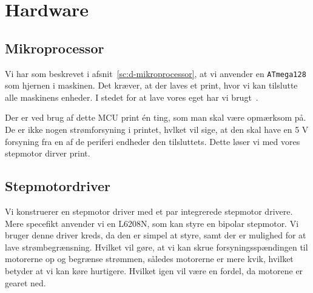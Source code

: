 \chapter[Implementering af hardware]{Hardware}


\section{Mikroprocessor}
\label{sc:i-mcu}
Vi har som beskrevet i afsnit~\vref{sc:d-mikroprocessor}, at vi
anvender en \texttt{ATmega128} som hjernen i maskinen. Det kræver, at
der laves et print, hvor vi kan tilslutte alle maskinens enheder. I
stedet for at lave vores eget har vi brugt~\cite{fronter:atmega128}.

Der er ved brug af dette MCU print én ting, som man skal være
opmærksom på. De er ikke nogen strømforsyning i printet, hvlket vil
sige, at den skal have en 5 V forsyning fra en af de periferi endheder
den tilsluttets. Dette løser vi med vores stepmotor dirver print.

\section{Stepmotordriver}
\label{sc:stepmotor-driver}


Vi konstruerer en stepmotor driver med et par integrerede stepmotor
drivere. Mere specefikt anvender vi en L6208N, som kan styre en
bipolar stepmotor. Vi bruger denne driver kreds, da den er simpel at
styre, samt der er mulighed for at lave strømbegrænsning. Hvilket vil
gøre, at vi kan skrue forsyningsspændingen til motorerne op og
begrænse strømmen, således motorerne er mere kvik, hvilket betyder at
vi kan køre hurtigere. Hvilket igen vil være en fordel, da motorene er
gearet ned.

